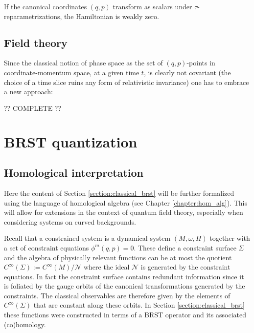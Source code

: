     \begin{property}
        If the canonical coordinates $(q,p)$ transform as scalars under $\tau$-reparametrizations, the Hamiltonian is weakly zero.
    \end{property}

\subsection{Field theory}

    Since the classical notion of phase space as the set of $(q,p)$-points in coordinate-momentum space, at a given time $t$, is clearly not covariant (the choice of a time slice ruins any form of relativistic invariance) one has to embrace a new approach:

    ?? COMPLETE ??

\section{BRST quantization}
\subsection{Homological interpretation}

    Here the content of Section \ref{section:classical_brst} will be further formalized using the language of homological algebra (see Chapter \ref{chapter:hom_alg}). This will allow for extensions in the context of quantum field theory, especially when considering systems on curved backgrounds.

    Recall that a constrained system is a dynamical system $(M,\omega,H)$ together with a set of constraint equations $\phi^m(q,p)=0$. These define a constraint surface $\Sigma$ and the algebra of physically relevant functions can be at most the quotient $C^\infty(\Sigma):=C^\infty(M)/\mathcal{N}$ where the ideal $\mathcal{N}$ is generated by the constraint equations. In fact the constraint surface contains redundant information since it is foliated by the gauge orbits of the canonical transformations generated by the constraints. The classical observables are therefore given by the elements of $C^\infty(\Sigma)$ that are constant along these orbits. In Section \ref{section:classical_brst} these functions were constructed in terms of a BRST operator and its associated (co)homology.

